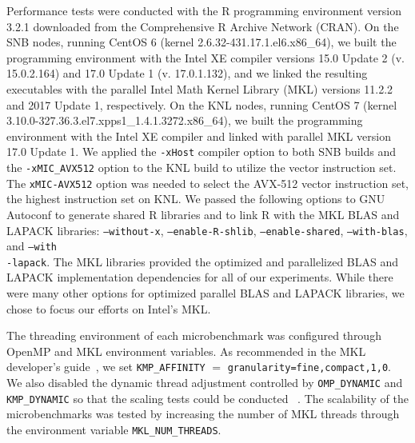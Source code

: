 Performance tests were conducted with the R programming environment version 3.2.1
downloaded from the Comprehensive R Archive Network (CRAN). On the SNB nodes, running CentOS 6
(kernel 2.6.32-431.17.1.el6.x86\_64), we built the programming environment with the Intel
XE compiler versions 15.0 Update 2 (v. 15.0.2.164) and 17.0 Update 1 (v. 17.0.1.132), and
we linked the resulting executables with the parallel Intel Math Kernel Library (MKL)
versions 11.2.2 and 2017 Update 1, respectively. On the KNL nodes, running CentOS 7
(kernel 3.10.0-327.36.3.el7.xpps1\_1.4.1.3272.x86\_64), we built the programming
environment with the Intel XE compiler and linked with parallel MKL version 17.0 Update 1.
We applied the \texttt{-xHost} compiler option to both SNB builds and the
\texttt{-xMIC\_AVX512} option to the KNL build to utilize the
vector instruction set. The \texttt{xMIC-AVX512} option was needed to select the AVX-512
vector instruction set, the highest instruction set on KNL.  We passed the following
options to GNU Autoconf to generate shared R libraries and to link R with the MKL BLAS and
LAPACK libraries: \texttt{--without-x}, \texttt{--enable-R-shlib},
\texttt{--enable-shared}, \texttt{--with-blas}, and \texttt{--with\\-lapack}. The MKL
libraries provided the optimized and parallelized BLAS and LAPACK implementation
dependencies for all of our experiments. While there were many other options for optimized
parallel BLAS and LAPACK libraries, we chose to focus our efforts on Intel's MKL.

The threading environment of each microbenchmark was configured through OpenMP and MKL
environment variables. As recommended in the MKL developer's guide~\cite{intel:mkl2017},
we set \texttt{KMP\_AFFINITY} $=$ \texttt{granularity=fine,compact,1,0}.
We also disabled the dynamic thread adjustment controlled by \texttt{OMP\_DYNAMIC} and
\texttt{KMP\_DYNAMIC} so that the scaling tests could be conducted ~\cite{intel:cpp2015,
intel:cpp2017, intel:mkl11_2, intel:mkl2017}. The scalability of the microbenchmarks was
tested by increasing the number of MKL threads through the environment variable
\texttt{MKL\_NUM\_THREADS}.


